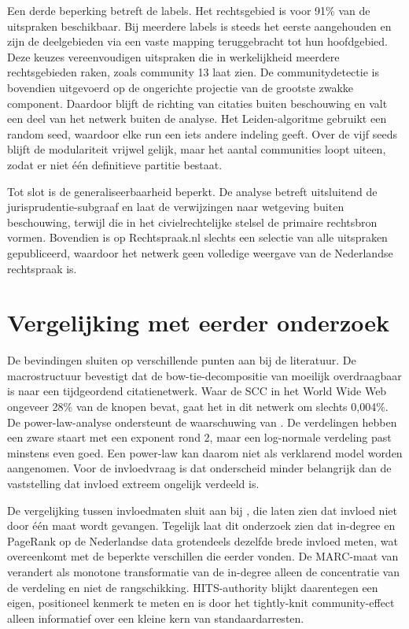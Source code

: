 \documentclass[a4paper, 12pt]{report}
\begin{document}
Een derde beperking betreft de labels. Het rechtsgebied is voor 91\% van de uitspraken beschikbaar. Bij meerdere labels is steeds het eerste aangehouden en zijn de deelgebieden via een vaste mapping teruggebracht tot hun hoofdgebied. Deze keuzes vereenvoudigen uitspraken die in werkelijkheid meerdere rechtsgebieden raken, zoals community 13 laat zien. De communitydetectie is bovendien uitgevoerd op de ongerichte projectie van de grootste zwakke component. Daardoor blijft de richting van citaties buiten beschouwing en valt een deel van het netwerk buiten de analyse. Het Leiden-algoritme gebruikt een random seed, waardoor elke run een iets andere indeling geeft. Over de vijf seeds blijft de modulariteit vrijwel gelijk, maar het aantal communities loopt uiteen, zodat er niet één definitieve partitie bestaat.

Tot slot is de generaliseerbaarheid beperkt. De analyse betreft uitsluitend de jurisprudentie-subgraaf en laat de verwijzingen naar wetgeving buiten beschouwing, terwijl die in het civielrechtelijke stelsel de primaire rechtsbron vormen. Bovendien is op Rechtspraak.nl slechts een selectie van alle uitspraken gepubliceerd, waardoor het netwerk geen volledige weergave van de Nederlandse rechtspraak is.
 
\section{Vergelijking met eerder onderzoek}
De bevindingen sluiten op verschillende punten aan bij de literatuur. De macrostructuur bevestigt dat de bow-tie-decompositie van \textcite{broder2000} moeilijk overdraagbaar is naar een tijdgeordend citatienetwerk. Waar de SCC in het World Wide Web ongeveer 28\% van de knopen bevat, gaat het in dit netwerk om slechts 0,004\%. De power-law-analyse ondersteunt de waarschuwing van \textcite{broido2019}. De verdelingen hebben een zware staart met een exponent rond 2, maar een log-normale verdeling past minstens even goed. Een power-law kan daarom niet als verklarend model worden aangenomen. Voor de invloedvraag is dat onderscheid minder belangrijk dan de vaststelling dat invloed extreem ongelijk verdeeld is.

De vergelijking tussen invloedmaten sluit aan bij \textcite{fowler2008}, die laten zien dat invloed niet door één maat wordt gevangen. Tegelijk laat dit onderzoek zien dat in-degree en PageRank op de Nederlandse data grotendeels dezelfde brede invloed meten, wat overeenkomt met de beperkte verschillen die \textcite{winkels2011} eerder vonden. De MARC-maat van \textcite{vanopijnen2012} verandert als monotone transformatie van de in-degree alleen de concentratie van de verdeling en niet de rangschikking. HITS-authority blijkt daarentegen een eigen, positioneel kenmerk te meten en is door het tightly-knit community-effect alleen informatief over een kleine kern van standaardarresten.
 
\end{document}

